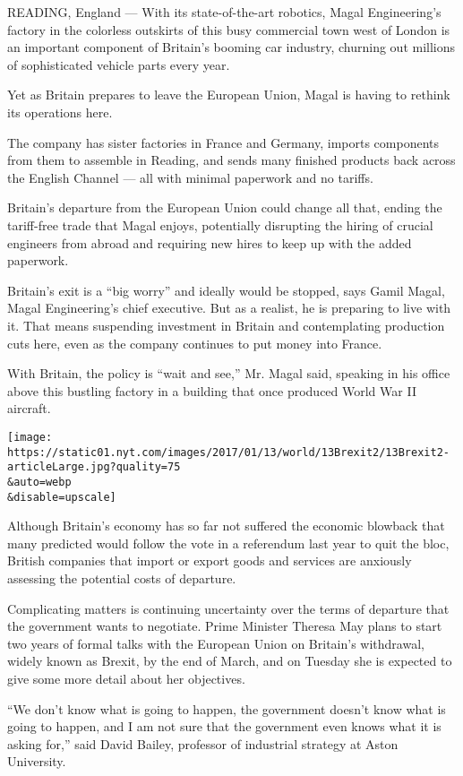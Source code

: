 READING, England --- With its state-of-the-art robotics, Magal
Engineering's factory in the colorless outskirts of this busy commercial
town west of London is an important component of Britain's booming car
industry, churning out millions of sophisticated vehicle parts every
year.

Yet as Britain prepares to leave the European Union, Magal is having to
rethink its operations here.

The company has sister factories in France and Germany, imports
components from them to assemble in Reading, and sends many finished
products back across the English Channel --- all with minimal paperwork
and no tariffs.

Britain's departure from the European Union could change all that,
ending the tariff-free trade that Magal enjoys, potentially disrupting
the hiring of crucial engineers from abroad and requiring new hires to
keep up with the added paperwork.

Britain's exit is a ``big worry'' and ideally would be stopped, says
Gamil Magal, Magal Engineering's chief executive. But as a realist, he
is preparing to live with it. That means suspending investment in
Britain and contemplating production cuts here, even as the company
continues to put money into France.

With Britain, the policy is ``wait and see,'' Mr. Magal said, speaking
in his office above this bustling factory in a building that once
produced World War II aircraft.

\texttt{[image: https://static01.nyt.com/images/2017/01/13/world/13Brexit2/13Brexit2-articleLarge.jpg?quality=75\\\&auto=webp\\\&disable=upscale]}

Although Britain's economy has so far not suffered the economic blowback
that many predicted would follow the vote in a referendum last year to
quit the bloc, British companies that import or export goods and
services are anxiously assessing the potential costs of departure.

Complicating matters is continuing uncertainty over the terms of
departure that the government wants to negotiate. Prime Minister Theresa
May plans to start two years of formal talks with the European Union on
Britain's withdrawal, widely known as Brexit, by the end of March, and
on Tuesday she is expected to give some more detail about her
objectives.

``We don't know what is going to happen, the government doesn't know
what is going to happen, and I am not sure that the government even
knows what it is asking for,'' said David Bailey, professor of
industrial strategy at Aston University.

